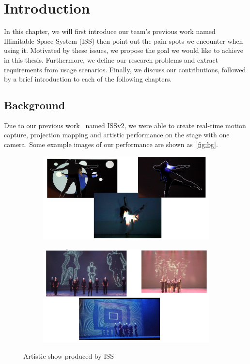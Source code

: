 \chapter{Introduction}
\label{chap:Introduction}


In this chapter, we will first introduce our team's previous work named Illimitable Space System (ISS) then point
out the pain spots we encounter when using it.
Motivated by these issues, we propose the goal we would like to
achieve in this thesis.
Furthermore, we define our research problems and extract
requirements from usage scenarios.
Finally, we discuss our contributions, followed by a brief introduction
to each of the following chapters.

\section{Background}
\label{sec:intro-background}

Due to our previous work~\cite{iss-v2-design-theory-journal} named ISSv2, we
were able to create real-time motion capture, projection mapping and artistic
performance on the stage with one camera. Some example images of our
performance are shown as~\autoref{fig:bg}.

\begin{figure}[ht]
    \begin{subfigure}
        \centering
        \includegraphics[width=.8\linewidth]{figures/bg1.png}
        \label{fig:sub-first}
    \end{subfigure}
    \begin{subfigure}
        \centering
        \includegraphics[width=.8\linewidth]{figures/bg2.png}
        \label{fig:sub-second}
    \end{subfigure}
    \caption{Artistic show produced by ISS}
    \label{fig:bg}
\end{figure}

